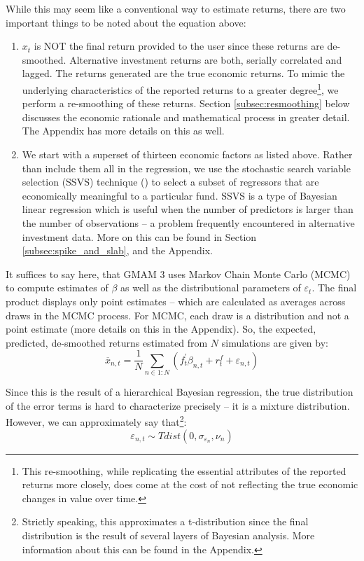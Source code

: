 \documentclass[11pt]{article}
\begin{document}
While this may seem like a conventional way to estimate returns, there are two important things to be noted about the equation above:
\begin{enumerate}
	\item $x_t$ is NOT the final return provided to the user since these returns are de-smoothed. Alternative investment returns are both, serially correlated and lagged. The returns generated are the true economic returns. To mimic the underlying characteristics of the reported returns to a greater degree\footnote{This re-smoothing, while replicating the essential attributes of the reported returns more closely, does come at the cost of not reflecting the true economic changes in value over time.}, we perform a re-smoothing of these returns. Section \ref{subsec:resmoothing} below discusses the economic rationale and mathematical process in greater detail. The Appendix has more details on this as well.
	\item We start with a superset of thirteen economic factors as listed above. Rather than include them all in the regression, we use the stochastic search variable selection (SSVS) technique (\cite{george_and_mcculloch}) to select a subset of regressors that are economically meaningful to a particular fund. SSVS is a type of Bayesian linear regression which is useful when the number of predictors is larger than the number of observations – a problem frequently encountered in alternative investment data. More on this can be found in Section \ref{subsec:spike_and_slab}, and the Appendix.
\end{enumerate}

It suffices to say here, that GMAM 3 uses Markov Chain Monte Carlo (MCMC) to compute estimates of $\beta$ as well as the distributional parameters of $\varepsilon_t$. The final product displays only point estimates – which are calculated as averages across draws in the MCMC process. For MCMC, each draw is a distribution and not a point estimate (more details on this in the Appendix). So, the expected, predicted, de-smoothed returns estimated from $N$ simulations are given by:
\begin{equation}
	\overline{x}_{n,t} = \frac{1}{N} \sum_{n \in 1:N} \left( f^{\prime}_t \beta_{n,t} + r_t^f + \varepsilon_{n,t} \right)
\end{equation}

Since this is the result of a hierarchical Bayesian regression, the true distribution of the error terms is hard to characterize precisely -- it is a mixture distribution. However, we can approximately say that\footnote{Strictly speaking, this approximates a t-distribution since the final distribution is the result of several layers of Bayesian analysis. More information about this can be found in the Appendix.}:
\begin{equation*}
	\varepsilon_{n,t} \sim Tdist \left( 0, \sigma_{\varepsilon_n}, \nu_n \right)
\end{equation*}
\end{document}
